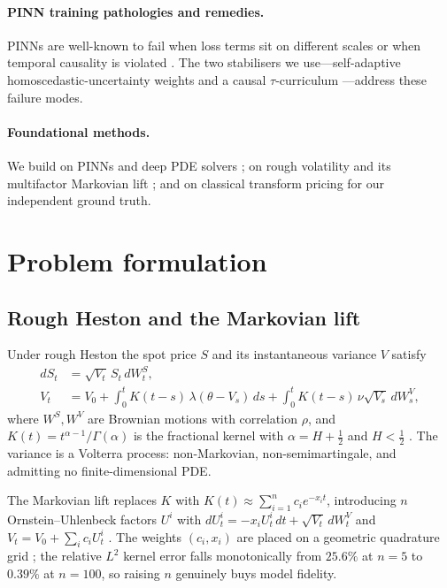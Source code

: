 \documentclass[review,12pt]{elsarticle}
\begin{document}
\paragraph{PINN training pathologies and remedies.}
PINNs are well-known to fail when loss terms sit on different scales or when
temporal causality is violated \citep{krishnapriyan2021characterizing,wang2022when}.
The two stabilisers we use---self-adaptive homoscedastic-uncertainty weights
\citep{kendall2018multitask,mcclenny2023self} and a causal $\tau$-curriculum
\citep{wang2024respecting}---address these failure modes.

\paragraph{Foundational methods.}
We build on PINNs \citep{raissi2019physics} and deep PDE solvers
\citep{sirignano2018dgm,han2018solving}; on rough volatility
\citep{gatheral2018volatility,eleuch2019characteristic} and its multifactor
Markovian lift \citep{abijaber2019multifactor,abijaber2019lifting}; and on
classical transform pricing \citep{heston1993closed,carr1999option} for our
independent ground truth.

\section{Problem formulation}
\label{sec:problem}

\subsection{Rough Heston and the Markovian lift}
Under rough Heston the spot price $S$ and its instantaneous variance $V$ satisfy
\begin{align}
  dS_t &= \sqrt{V_t}\,S_t\,dW^S_t, \\
  V_t  &= V_0 + \int_0^t K(t-s)\,\lambda(\theta - V_s)\,ds
          + \int_0^t K(t-s)\,\nu\sqrt{V_s}\,dW^V_s,
\end{align}
where $W^S, W^V$ are Brownian motions with correlation $\rho$, and
$K(t)=t^{\alpha-1}/\Gamma(\alpha)$ is the fractional kernel with
$\alpha=H+\tfrac12$ and $H<\tfrac12$ \citep{gatheral2018volatility,eleuch2019characteristic}.
The variance is a Volterra process: non-Markovian, non-semimartingale, and
admitting no finite-dimensional PDE.

The Markovian lift replaces $K$ with
$K(t)\approx\sum_{i=1}^{n}c_i e^{-x_i t}$, introducing $n$
Ornstein--Uhlenbeck factors $U^i$ with $dU^i_t = -x_i U^i_t\,dt + \sqrt{V_t}\,dW^V_t$
and $V_t = V_0 + \sum_i c_i U^i_t$
\citep{abijaber2019multifactor,abijaber2019lifting}.  The weights $(c_i,x_i)$
are placed on a geometric quadrature grid \citep{abijaber2019multifactor}; the
relative $L^2$ kernel error falls monotonically from $25.6\%$ at $n{=}5$ to
$0.39\%$ at $n{=}100$, so raising $n$ genuinely buys model fidelity.
\end{document}
